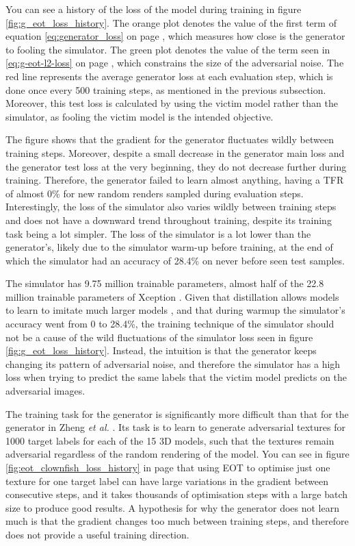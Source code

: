 You can see a history of the loss of the model during training in figure \ref{fig:g_eot_loss_history}. The orange plot denotes the value of the first term of equation \ref{eq:generator_loss} on page \pageref{eq:generator_loss}, which measures how close is the generator to fooling the simulator. The green plot denotes the value of the term seen in \ref{eq:g-eot-l2-loss} on page \pageref{eq:g-eot-l2-loss}, which constrains the size of the adversarial noise. The red line represents the average generator loss at each evaluation step, which is done once every 500 training steps, as mentioned in the previous subsection. Moreover, this test loss is calculated by using the victim model rather than the simulator, as fooling the victim model is the intended objective.

The figure shows that the gradient for the generator fluctuates wildly between training steps. Moreover, despite a small decrease in the generator main loss and the generator test loss at the very beginning, they do not decrease further during training. Therefore, the generator failed to learn almost anything, having a TFR of almost 0\% for new random renders sampled during evaluation steps. Interestingly, the loss of the simulator also varies wildly between training steps and does not have a downward trend throughout training, despite its training task being a lot simpler. The loss of the simulator is a lot lower than the generator's, likely due to the simulator warm-up before training, at the end of which the simulator had an accuracy of 28.4\% on never before seen test samples.

The simulator has 9.75 million trainable parameters, almost half of the 22.8 million trainable parameters of Xception \cite{xception}. Given that distillation allows models to learn to imitate much larger models \cite{distillation}, and that during warmup the simulator's accuracy went from 0 to 28.4\%, the training technique of the simulator should not be a cause of the wild fluctuations of the simulator loss seen in figure \ref{fig:g_eot_loss_history}. Instead, the intuition is that the generator keeps changing its pattern of adversarial noise, and therefore the simulator has a high loss when trying to predict the same labels that the victim model predicts on the adversarial images.

The training task for the generator is significantly more difficult than that for the generator in Zheng \textit{et al.} \cite{zheng_black_box_GAN}. Its task is to learn to generate adversarial textures for 1000 target labels for each of the 15 3D models, such that the textures remain adversarial regardless of the random rendering of the model. You can see in figure \ref{fig:eot_clownfish_loss_history} in page \pageref{fig:eot_clownfish_loss_history} that using EOT to optimise just one texture for one target label can have large variations in the gradient between consecutive steps, and it takes thousands of optimisation steps with a large batch size to produce good results. A hypothesis for why the generator does not learn much is that the gradient changes too much between training steps, and therefore does not provide a useful training direction.

